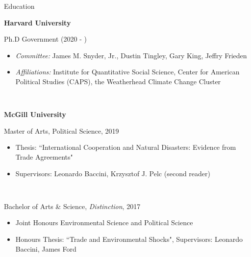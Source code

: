 \documentclass{resume}
\providecommand{\NewEntry}[2]{
  \textbf{#1} \hfill #2\\
}
\begin{document}

\begin{rSection}{\Large E\MakeLowercase{ducation}}

{\bf Harvard University} \hfill {\em } 

Ph.D Government (2020 - ) \hfill { } 
\NewEntry{}
{\vspace{-\baselineskip}
\begin{itemize}[topsep=0pt]
\medskip
    \item[] \textit{Committee:} James M. Snyder, Jr., Dustin Tingley, Gary King, Jeffry Frieden 
   \item[] \textit{Affiliations:} Institute for Quantitative Social Science, Center for American Political Studies (CAPS), the Weatherhead Climate Change Cluster


\end{itemize}
}
\bigskip

{\bf McGill University} \hfill {\em } 


Master of Arts, Political Science, 2019 \hfill { } 
\NewEntry{}
{\vspace{-\baselineskip}
\begin{itemize}[topsep=0pt]
 \medskip
  \item[] Thesis: ``International Cooperation and Natural Disasters: Evidence from Trade Agreements"
    \vspace{-\baselineskip}
     \medskip
  \item[] Supervisors: Leonardo Baccini, Krzysztof J. Pelc (second reader)
      \vspace{-\baselineskip}
     \medskip


\end{itemize}
}
\medskip
\smallskip

Bachelor of Arts \& Science, \textit{Distinction}, 2017
\NewEntry{}
{
\vspace{-\baselineskip}
\medskip
\begin{itemize}[topsep=0pt]
  \setlength\itemsep{-0.7em}
  \item[] Joint Honours Environmental Science and Political Science
  \item[] Honours Thesis: ``Trade and Environmental Shocks", Supervisors: Leonardo Baccini, James Ford

\end{itemize}
}




\end{rSection}
\end{document}
